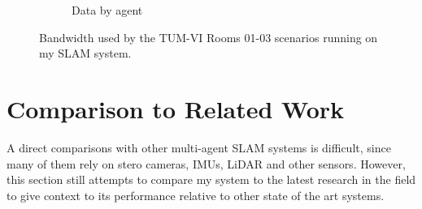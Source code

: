 \begin{figure}[h]
\begin{subfigure}[b]{0.45\linewidth}
        \caption{Data by agent}
    \end{subfigure}%

    \caption{Bandwidth used by the TUM-VI Rooms 01-03 scenarios running on my SLAM system.}
    \label{fig:tum-rooms-01-03-bandwith}
\end{figure}


\section{Comparison to Related Work}
\label{sec:comparison-to-related-work}

A direct comparisons with other multi-agent SLAM systems is difficult, since many of them rely on stero cameras, IMUs, LiDAR and other sensors. However, this section still attempts to compare my system to the latest research in the field to give context to its performance relative to other state of the art systems.

